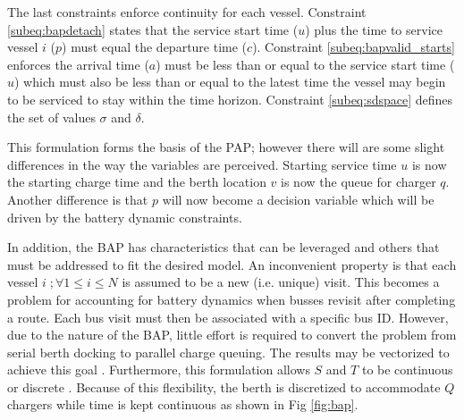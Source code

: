 \documentclass[letterpaper, 10pt, conference]{IEEEtran}
\begin{document}

The last constraints enforce continuity for each vessel. Constraint \eqref{subeq:bapdetach} states that the service start time (\(u\)) plus the time to service vessel \(i\) (\(p\)) must equal the departure time (\(c\)). Constraint \eqref{subeq:bapvalid_starts} enforces the arrival time (\(a\)) must be less than or equal to the service start time (\(u\)) which must also be less than or equal to the latest time the vessel may begin to be serviced to stay within the time horizon. Constraint \eqref{subeq:sdspace} defines the set of values \(\sigma\) and \(\delta\).

This formulation forms the basis of the PAP; however there will are some slight differences in the way the variables are perceived. Starting service time \(u\) is now the starting charge time and the berth location \(v\) is now the queue for charger \(q\). Another difference is that \(p\) will now become a decision variable which will be driven by the battery dynamic constraints.

In addition, the BAP has characteristics that can be leveraged and others that must be addressed to fit the desired model. An inconvenient property is that each vessel \(i\;; \forall 1 \leq i \leq N\) is assumed to be a new (i.e. unique) visit. This becomes a problem for accounting for battery dynamics when busses revisit after completing a route. Each bus visit must then be associated with a specific bus ID. However, due to the nature of the BAP, little effort is required to convert the problem from serial berth docking to parallel charge queuing. The results may be vectorized to achieve this goal \cite{Qarebagh2019}. Furthermore, this formulation allows \(S\) and \(T\) to be continuous or discrete \cite{Frojan2015,Buhrkal2010}. Because of this flexibility, the berth is discretized to accommodate \(Q\) chargers while time is kept continuous as shown in Fig \ref{fig:bap}.
\end{document}
